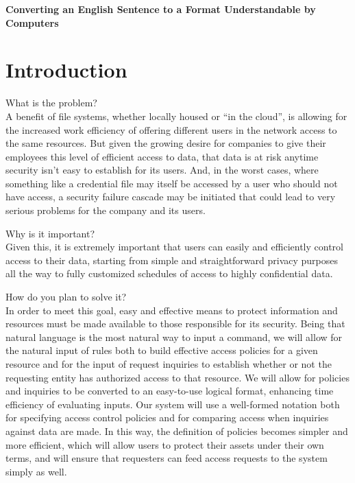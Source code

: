\documentclass[12pt]{article}
\begin{document}

\begin{center}
\textbf{Converting an English Sentence to a Format Understandable by Computers}
\end{center}

\section{Introduction}
What is the problem? \\
A benefit of file systems, whether locally housed or “in the cloud”, is allowing for the increased work efficiency of offering different users in the network access to the same resources. But given the growing desire for companies to give their employees this level of efficient access to data, that data is at risk anytime security isn’t easy to establish for its users. And, in the worst cases, where something like a credential file may itself be accessed by a user who should not have access, a security failure cascade may be initiated that could lead to very serious problems for the company and its users.

Why is it important? \\
Given this, it is extremely important that users can easily and efficiently control access to their data, starting from simple and straightforward privacy purposes all the way to fully customized schedules of access to highly confidential data.

How do you plan to solve it? \\
In order to meet this goal, easy and effective means to protect information and resources must be made available to those responsible for its security. 
Being that natural language is the most natural way to input a command, we will allow for the natural input of rules both to build effective access policies for a given resource and for the input of request inquiries to establish whether or not the requesting entity has authorized access to that resource.
We will allow for policies and inquiries to be converted to an easy-to-use logical format, enhancing time efficiency of evaluating inputs. 
Our system will use a well-formed notation both for specifying access control policies and for comparing access when inquiries against data are made.
In this way, the definition of policies becomes simpler and more efficient, which will allow users to protect their assets under their own terms, and will ensure that requesters can feed access requests to the system simply as well.
\end{document}
